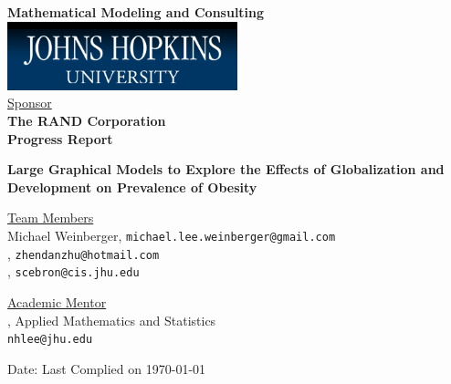 \documentclass[oneside,12pt]{report}
\begin{document}
\def\thefootnote{\fnsymbol{footnote}}

\thispagestyle{empty}

\def\shiftdowna{0.32in}  %
\def\shiftdownb{0.22in}  %


\begin{center}
\textbf{{\large Mathematical Modeling and Consulting }}\\

\vspace \shiftdowna
\includegraphics[width=0.5\textwidth]{jhu.png}\\

\vspace \shiftdowna
\underline {Sponsor}\\ 
\vspace{5pt}
\textbf{\large The RAND Corporation} \\
\vspace\shiftdowna
\textbf{{Progress Report}}

\vspace \shiftdowna
\textbf{{\Large Large Graphical Models to Explore the Effects of Globalization and Development on Prevalence of Obesity}}

\vspace{0.35in}
\underline {Team Members}\\

Michael Weinberger, \texttt{michael.lee.weinberger@gmail.com} \\
\vspace{3pt}
, \texttt{zhendanzhu@hotmail.com} \\
\vspace{3pt}
, \texttt{scebron@cis.jhu.edu}

\vspace \shiftdownb
\underline {Academic Mentor} \\
\vspace{5pt}
, Applied Mathematics and Statistics\\
\texttt{nhlee@jhu.edu}


\vspace \shiftdowna
Date: Last Complied on \today

\end{center}
\end{document}
